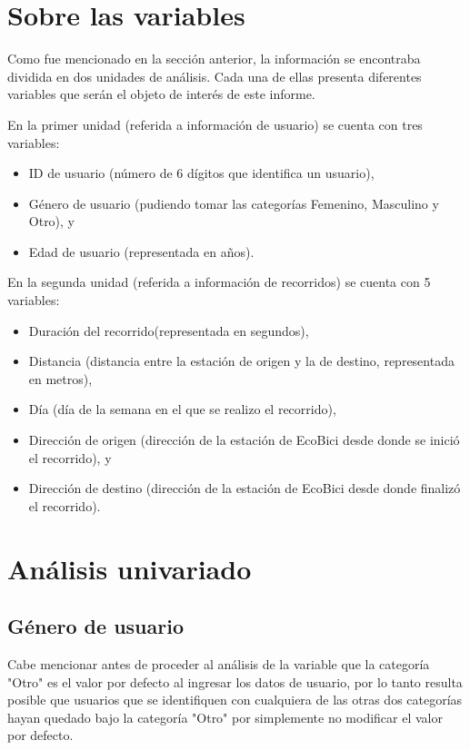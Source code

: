 \documentclass[11pt]{article}
\begin{document}
\section{Sobre las variables}
Como fue mencionado en la secci\'on anterior, la informaci\'on se encontraba dividida en dos unidades de an\'alisis.
Cada una de ellas presenta diferentes variables que ser\'an el objeto de inter\'es de este informe.
\par
En la primer unidad (referida a informaci\'on de usuario) se cuenta con tres variables: 
\begin{itemize}
    \item ID de usuario (n\'umero de 6 d\'igitos que identifica un usuario), 
    \item G\'enero de usuario (pudiendo tomar las categor\'ias Femenino, Masculino y Otro), y
    \item Edad de usuario (representada en a\~{n}os).
\end{itemize}

\par
En la segunda unidad (referida a informaci\'on de recorridos) se cuenta con 5 variables: 

\begin{itemize}
    \item Duraci\'on del recorrido(representada en segundos), 
    \item Distancia (distancia entre la estaci\'on de origen y la de destino, representada en metros), 
    \item D\'ia (d\'ia de la semana en el que se realizo el recorrido), 
    \item Direcci\'on de origen (direcci\'on de la estaci\'on de EcoBici desde donde se inici\'o el recorrido), y
    \item Direcci\'on de destino (direcci\'on de la estaci\'on de EcoBici desde donde finaliz\'o el recorrido). 
\end{itemize}

\section{An\'alisis univariado}

\subsection{G\'enero de usuario}

Cabe mencionar antes de proceder al an\'alisis de la variable que la categor\'ia "Otro" es el valor por defecto
al ingresar los datos de usuario, por lo tanto resulta posible que usuarios que se identifiquen con cualquiera
de las otras dos categor\'ias hayan quedado bajo la categor\'ia "Otro" por simplemente no modificar el valor por defecto.
\end{document}

